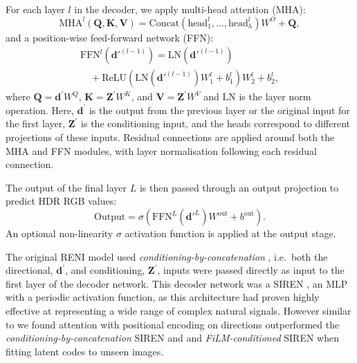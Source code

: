 For each layer \( l \) in the decoder, we apply multi-head attention (MHA):
\begin{equation}
    \text{MHA}^l(\mathbf{Q}, \mathbf{K}, \mathbf{V}) = \text{Concat}(\text{head}_1^l, \ldots, \text{head}_h^l)W^O + \mathbf{Q},
\end{equation}
and a position-wise feed-forward network (FFN):
\begin{multline}
\text{FFN}^l(\mathbf{d}'^{(l-1)}) = \text{LN}(\mathbf{d}'^{(l-1)}) \\
\quad + \text{ReLU}(\text{LN}(\mathbf{d}'^{(l-1)})W_1^l + b_1^l)W_2^l + b_2^l,
\end{multline}
where $ \mathbf{Q} = \mathbf{d}^\prime W^Q $, $ \mathbf{K} = \mathbf{Z}^\prime W^K $, and $ \mathbf{V} = \mathbf{Z}^\prime W^V $ and $\text{LN}$ is the layer norm operation. Here, $ \mathbf{d}^\prime $ is the output from the previous layer or the original input for the first layer, $ \mathbf{Z}^\prime $ is the conditioning input, and the heads correspond to different projections of these inputs. Residual connections are applied around both the MHA and FFN modules, with layer normalisation following each residual connection.

The output of the final layer $L$ is then passed through an output projection to predict HDR RGB values:
\begin{equation}
\text{Output} = \sigma(\text{FFN}^L(\mathbf{d}'^L)W^{\text{out}} + b^{\text{out}}).
\end{equation}
An optional non-linearity $ \sigma $ activation function is applied at the output stage.

The original RENI model \cite{gardner2022rotation} used \emph{conditioning-by-concatenation} \cite{sitzmann_implicit_2020, xie_neural_2021}, i.e.~both the directional, $\mathbf{d}^\prime$, and conditioning, $\mathbf{Z}^\prime$, inputs were passed directly as input to the first layer of the decoder network. This decoder network was a SIREN \cite{sitzmann_implicit_2020}, an MLP with a periodic activation function, as this architecture had proven highly effective at representing a wide range of complex natural signals. However similar to \cite{rebainAttentionBeatsConcatenation2023} we found attention with positional encoding on directions outperformed the \emph{conditioning-by-concatenation} SIREN and \cite{sitzmann_implicit_2020, xie_neural_2021} and \emph{FiLM-conditioned} \cite{chan_pi-gan_2021} SIREN when fitting latent codes to unseen images.


